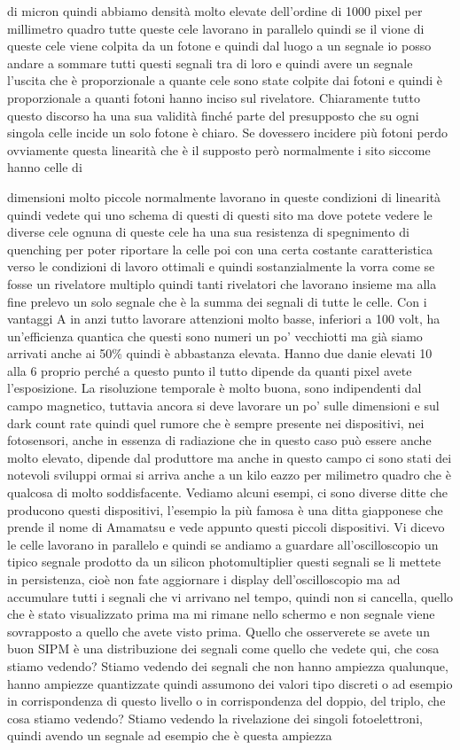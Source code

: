 di micron quindi abbiamo densità molto elevate dell'ordine di 1000 pixel per millimetro quadro tutte queste cele lavorano in parallelo quindi se il vione di queste cele viene colpita da un fotone e quindi dal luogo a un segnale io posso andare a sommare tutti questi segnali tra di loro e quindi avere un segnale l'uscita che è proporzionale a quante cele sono state colpite dai fotoni e quindi è proporzionale a quanti fotoni hanno inciso sul rivelatore. Chiaramente tutto questo discorso ha una sua validità finché parte del presupposto che su ogni singola celle incide un solo fotone è chiaro. Se dovessero incidere più fotoni perdo ovviamente questa linearità che è il supposto però normalmente i sito siccome hanno celle di 

dimensioni molto piccole normalmente lavorano in queste condizioni di linearità quindi vedete qui uno schema di questi di questi sito ma dove potete vedere le diverse cele ognuna di queste cele ha una sua resistenza di spegnimento di quenching per poter riportare la celle poi con una certa costante caratteristica verso le condizioni di lavoro ottimali e quindi sostanzialmente la vorra come se fosse un rivelatore multiplo quindi tanti rivelatori che lavorano insieme ma alla fine prelevo un solo segnale che è la summa dei segnali di tutte le celle. Con i vantaggi A in anzi tutto lavorare attenzioni molto basse, inferiori a 100 volt, ha un'efficienza quantica che questi sono numeri un po' vecchiotti ma già siamo arrivati anche ai 50\% quindi è abbastanza elevata. Hanno due danie elevati 10 alla 6 proprio perché a questo punto il tutto dipende da quanti pixel avete l'esposizione. La risoluzione temporale è molto buona, sono indipendenti dal campo magnetico, tuttavia ancora si deve lavorare un po' sulle dimensioni e sul dark count rate quindi quel rumore che è sempre presente nei dispositivi, nei fotosensori, anche in essenza di radiazione che in questo caso può essere anche molto elevato, dipende dal produttore ma anche in questo campo ci sono stati dei notevoli sviluppi ormai si arriva anche a un kilo eazzo per milimetro quadro che è qualcosa di molto soddisfacente. Vediamo alcuni esempi, ci sono diverse ditte che producono questi dispositivi, l'esempio la più famosa è una ditta giapponese che prende il nome di Amamatsu e vede appunto questi piccoli dispositivi. Vi dicevo le celle lavorano in parallelo e quindi se andiamo a guardare all'oscilloscopio un tipico segnale prodotto da un silicon photomultiplier questi segnali se li mettete in persistenza, cioè non fate aggiornare i display dell'oscilloscopio ma ad accumulare tutti i segnali che vi arrivano nel tempo, quindi non si cancella, quello che è stato visualizzato prima ma mi rimane nello schermo e non segnale viene sovrapposto a quello che avete visto prima. Quello che osserverete se avete un buon SIPM è una distribuzione dei segnali come quello che vedete qui, che cosa stiamo vedendo? Stiamo vedendo dei segnali che non hanno ampiezza qualunque, hanno ampiezze quantizzate quindi assumono dei valori tipo discreti o ad esempio in corrispondenza di questo livello o in corrispondenza del doppio, del triplo, che cosa stiamo vedendo? Stiamo vedendo la rivelazione dei singoli fotoelettroni, quindi avendo un segnale ad esempio che è questa ampiezza 
